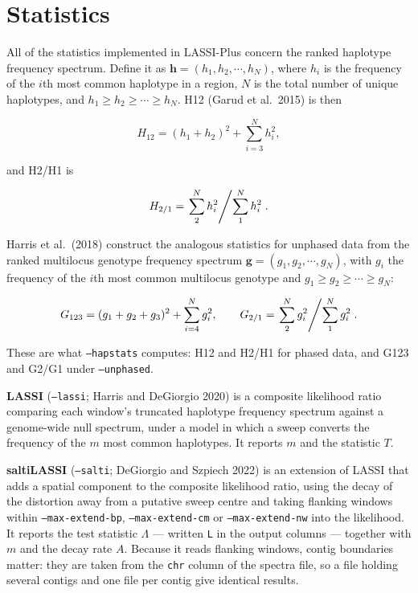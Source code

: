 \documentclass[11pt]{article}
\newcommand{\opt}[1]{\texttt{#1}}
\begin{document}
\section{Statistics}

All of the statistics implemented in LASSI-Plus concern the ranked haplotype
frequency spectrum. Define it as $\mathbf{h} = (h_1, h_2, \cdots, h_N)$, where
$h_i$ is the frequency of the $i$th most common haplotype in a region, $N$ is
the total number of unique haplotypes, and
$h_1 \geq h_2 \geq \cdots \geq h_N$. H12 (Garud et al.\ 2015) is then

\begin{equation*}
H_{12} = (h_1 + h_2)^2 + \sum_{i=3}^{N} h_i^2,
\end{equation*}

and H2/H1 is

\begin{equation*}
H_{2/1} = \left. \sum_{2}^{N} h_i^2 \middle/ \sum_{1}^{N} h_i^2 \right. .
\end{equation*}

Harris et al.\ (2018) construct the analogous statistics for unphased data
from the ranked multilocus genotype frequency spectrum
$\mathbf{g} = (g_1, g_2, \cdots, g_N)$, with $g_i$ the frequency of the $i$th
most common multilocus genotype and
$g_1 \geq g_2 \geq \cdots \geq g_N$:

\begin{equation*}
G_{123} = (g_1 + g_2 + g_3)^2 + \sum_{i=4}^{N} g_i^2,
\qquad
G_{2/1} = \left. \sum_{2}^{N} g_i^2 \middle/ \sum_{1}^{N} g_i^2 \right. .
\end{equation*}

These are what \opt{--hapstats} computes: H12 and H2/H1 for phased data, and
G123 and G2/G1 under \opt{--unphased}.

\textbf{LASSI} (\opt{--lassi}; Harris and DeGiorgio 2020) is a composite
likelihood ratio comparing each window's truncated haplotype frequency spectrum
against a genome-wide null spectrum, under a model in which a sweep converts the
frequency of the $m$ most common haplotypes. It reports $m$ and the statistic
$T$.

\textbf{saltiLASSI} (\opt{--salti}; DeGiorgio and Szpiech 2022) is an extension
of LASSI that adds a spatial component to the composite likelihood ratio,
using the decay of the distortion away from a putative sweep centre and taking
flanking windows within \opt{--max-extend-bp}, \opt{--max-extend-cm} or
\opt{--max-extend-nw} into the likelihood. It reports the test statistic
$\Lambda$ --- written \texttt{L} in the output columns --- together with $m$
and the decay rate $A$. Because it reads flanking windows, contig boundaries
matter: they are taken from the \texttt{chr} column of the spectra file, so a
file holding several contigs and one file per contig give identical results.
\end{document}
